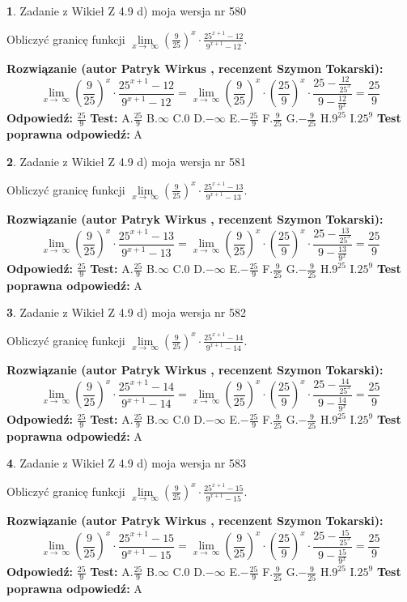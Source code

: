 \documentclass[12pt, a4paper]{article}
\theoremstyle{definition} %
\newtheorem{zad}{}
\newcommand{\zadStart}[1]{\begin{zad}#1\newline}
\newcommand{\zadStop}{\end{zad}}
\newcommand{\rozwStart}[2]{\noindent \textbf{Rozwiązanie (autor #1 , recenzent #2): }\newline}
\newcommand{\rozwStop}{\newline}
\newcommand{\odpStart}{\noindent \textbf{Odpowiedź:}\newline}
\newcommand{\odpStop}{\newline}
\newcommand{\testStart}{\noindent \textbf{Test:}\newline}
\newcommand{\testStop}{\newline}
\newcommand{\kluczStart}{\noindent \textbf{Test poprawna odpowiedź:}\newline}
\newcommand{\kluczStop}{\newline}
\begin{document}
\zadStart{Zadanie z Wikieł Z 4.9 d) moja wersja nr 580}


Obliczyć granicę funkcji  $\lim\limits_{x\to\ \infty}(\frac{9}{25})^{x}\cdot\frac{25^{x+1}-12}{9^{x+1}-12}$.
\zadStop
\rozwStart{Patryk Wirkus}{Szymon Tokarski}
$$\lim\limits_{x\to\ \infty}(\frac{9}{25})^{x}\cdot\frac{25^{x+1}-12}{9^{x+1}-12}=\lim\limits_{x\to\ \infty}(\frac{9}{25})^{x}\cdot(\frac{25}{9})^{x} \cdot \frac{25-\frac{12}{25^{x}}}{9-\frac{12}{9^{x}}} = \frac{25}{9}$$
\rozwStop
\odpStart
$\frac{25}{9}$
\odpStop
\testStart
A.$\frac{25}{9}$ B.$\infty$ C.$0$ D.$-\infty$ E.$-\frac{25}{9}$
F.$\frac{9}{25}$ G.$-\frac{9}{25}$
H.$9^{25}$
I.$25^{9}$
\testStop
\kluczStart
A
\kluczStop



\zadStart{Zadanie z Wikieł Z 4.9 d) moja wersja nr 581}


Obliczyć granicę funkcji  $\lim\limits_{x\to\ \infty}(\frac{9}{25})^{x}\cdot\frac{25^{x+1}-13}{9^{x+1}-13}$.
\zadStop
\rozwStart{Patryk Wirkus}{Szymon Tokarski}
$$\lim\limits_{x\to\ \infty}(\frac{9}{25})^{x}\cdot\frac{25^{x+1}-13}{9^{x+1}-13}=\lim\limits_{x\to\ \infty}(\frac{9}{25})^{x}\cdot(\frac{25}{9})^{x} \cdot \frac{25-\frac{13}{25^{x}}}{9-\frac{13}{9^{x}}} = \frac{25}{9}$$
\rozwStop
\odpStart
$\frac{25}{9}$
\odpStop
\testStart
A.$\frac{25}{9}$ B.$\infty$ C.$0$ D.$-\infty$ E.$-\frac{25}{9}$
F.$\frac{9}{25}$ G.$-\frac{9}{25}$
H.$9^{25}$
I.$25^{9}$
\testStop
\kluczStart
A
\kluczStop



\zadStart{Zadanie z Wikieł Z 4.9 d) moja wersja nr 582}


Obliczyć granicę funkcji  $\lim\limits_{x\to\ \infty}(\frac{9}{25})^{x}\cdot\frac{25^{x+1}-14}{9^{x+1}-14}$.
\zadStop
\rozwStart{Patryk Wirkus}{Szymon Tokarski}
$$\lim\limits_{x\to\ \infty}(\frac{9}{25})^{x}\cdot\frac{25^{x+1}-14}{9^{x+1}-14}=\lim\limits_{x\to\ \infty}(\frac{9}{25})^{x}\cdot(\frac{25}{9})^{x} \cdot \frac{25-\frac{14}{25^{x}}}{9-\frac{14}{9^{x}}} = \frac{25}{9}$$
\rozwStop
\odpStart
$\frac{25}{9}$
\odpStop
\testStart
A.$\frac{25}{9}$ B.$\infty$ C.$0$ D.$-\infty$ E.$-\frac{25}{9}$
F.$\frac{9}{25}$ G.$-\frac{9}{25}$
H.$9^{25}$
I.$25^{9}$
\testStop
\kluczStart
A
\kluczStop



\zadStart{Zadanie z Wikieł Z 4.9 d) moja wersja nr 583}


Obliczyć granicę funkcji  $\lim\limits_{x\to\ \infty}(\frac{9}{25})^{x}\cdot\frac{25^{x+1}-15}{9^{x+1}-15}$.
\zadStop
\rozwStart{Patryk Wirkus}{Szymon Tokarski}
$$\lim\limits_{x\to\ \infty}(\frac{9}{25})^{x}\cdot\frac{25^{x+1}-15}{9^{x+1}-15}=\lim\limits_{x\to\ \infty}(\frac{9}{25})^{x}\cdot(\frac{25}{9})^{x} \cdot \frac{25-\frac{15}{25^{x}}}{9-\frac{15}{9^{x}}} = \frac{25}{9}$$
\rozwStop
\odpStart
$\frac{25}{9}$
\odpStop
\testStart
A.$\frac{25}{9}$ B.$\infty$ C.$0$ D.$-\infty$ E.$-\frac{25}{9}$
F.$\frac{9}{25}$ G.$-\frac{9}{25}$
H.$9^{25}$
I.$25^{9}$
\testStop
\kluczStart
A
\kluczStop
\end{document}
